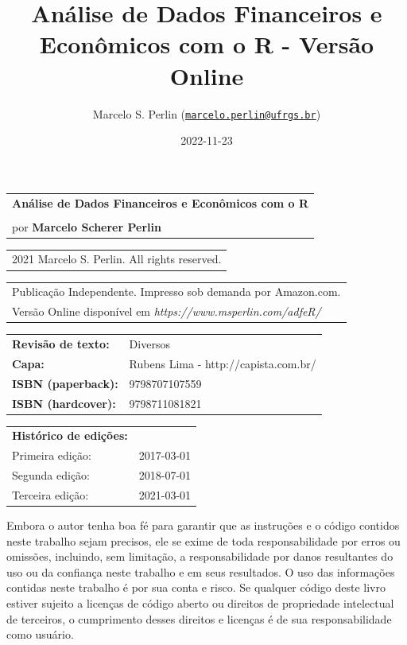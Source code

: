 \documentclass[
  11pt,
]{book}
\title{Análise de Dados Financeiros e Econômicos com o R - Versão Online}
\author{Marcelo S. Perlin (\href{mailto:marcelo.perlin@ufrgs.br}{\nolinkurl{marcelo.perlin@ufrgs.br}})}
\date{2022-11-23}
\begin{document}
\maketitle

\thispagestyle{empty}

\begin{tabular}{@{}l }
	\textbf{Análise de Dados Financeiros e Econômicos com o R}   \\
	{} \\
	por \textbf{Marcelo Scherer Perlin}
\end{tabular}

\vspace{0.75cm}

\begin{tabular}{@{}l }
	{\textcopyright} 2021 Marcelo S. Perlin. All rights reserved.
\end{tabular}

\begin{tabular}{@{}l }
	Publicação Independente. Impresso sob demanda por Amazon.com. \\
	Versão Online disponível em \textit{https://www.msperlin.com/adfeR/}
\end{tabular}


\vspace{0.75cm}

\begin{tabular}{@{} ll}
	\textbf{Revisão de texto:} & Diversos  \\
	\textbf{Capa:} & Rubens Lima - http://capista.com.br/  \\
	\textbf{ISBN (paperback):} & 9798707107559 \\
	\textbf{ISBN (hardcover):} & 9798711081821 \\
\end{tabular}

\vspace{0.5cm}

\begin{tabular}{@{} ll}
	\textbf{Histórico de edições:} &   \\
	  Primeira edição: & 2017-03-01 \\
	  Segunda edição: & 2018-07-01 \\
	  Terceira edição: &  2021-03-01 \\	  
\end{tabular}


\vspace{0.5cm}

Embora o autor tenha boa fé para garantir que as instruções e o código contidos neste trabalho sejam precisos, ele se exime de toda responsabilidade por erros ou omissões, incluindo, sem limitação, a responsabilidade por danos resultantes do uso ou da confiança neste trabalho e em seus resultados. O uso das informações contidas neste trabalho é por sua conta e risco. Se qualquer código deste livro estiver sujeito a licenças de código aberto ou direitos de propriedade intelectual de terceiros, o cumprimento desses direitos e licenças é de sua responsabilidade como usuário.
\end{document}
